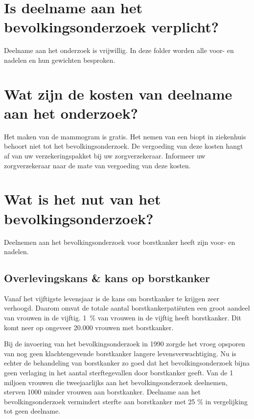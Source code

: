 \documentclass[a4paper,notumble]{leaflet}
\begin{document}
\section{Is deelname aan het bevolkingsonderzoek verplicht?}
Deelname aan het onderzoek is vrijwillig. In deze folder worden alle voor- en nadelen en hun gewichten besproken.
\section{Wat zijn de kosten van deelname aan het onderzoek?}
Het maken van de mammogram is gratis. Het nemen van een biopt in ziekenhuis behoort niet tot het bevolkingsonderzoek. De vergoeding van deze kosten hangt af van uw verzekeringspakket bij uw zorgverzekeraar. Informeer uw zorgverzekeraar naar de mate van vergoeding van deze kosten.
\section{Wat is het nut van het bevolkingsonderzoek?}
Deelnemen aan het bevolkingsonderzoek voor borstkanker heeft zijn voor- en nadelen.
\subsection{Overlevingskans \& kans op borstkanker}
Vanaf het vijftigste levensjaar is de kans om borstkanker te krijgen zeer verhoogd. Daarom omvat de totale aantal borstkankerpatiënten een groot aandeel van vrouwen in de vijftig. 1~\% van vrouwen in de vijftig heeft borstkanker. Dit komt neer op ongeveer 20.000 vrouwen met borstkanker.\par
Bij de invoering van het bevolkingsonderzoek in 1990 zorgde het vroeg opsporen van nog geen klachtengevende borstkanker langere levensverwachtiging. Nu is echter de behandeling van borstkanker zo goed dat het bevolkingsonderzoek bijna geen verlaging in het aantal sterftegevallen door borstkanker geeft. Van de 1 miljoen vrouwen die tweejaarlijks aan het bevolkingsonderzoek deelnemen, sterven 1000 minder vrouwen aan borstkanker. Deelname aan het bevolkingsonderzoek vermindert sterfte aan borstkanker met 25 \% in vergelijking tot geen deelname.
\end{document}
